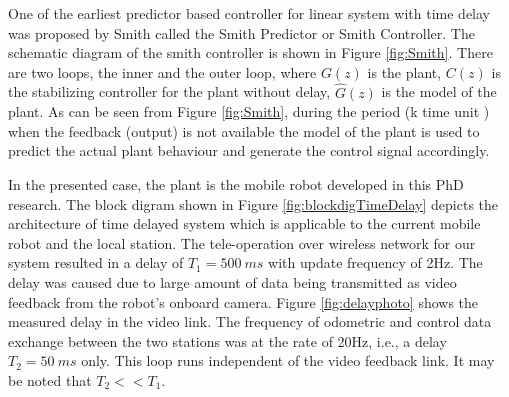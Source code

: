  One of the earliest predictor based controller for linear system with time delay  was proposed by Smith \cite{smith1959controller} called the Smith Predictor or Smith Controller. The schematic diagram of the smith controller is shown in Figure \ref{fig:Smith}. There are two loops, the inner and the outer loop, where $G(z)$ is the plant, $C(z)$ is the stabilizing controller  for the plant without delay, $\hat{G}(z)$ is the model of the plant.  As can be seen from  Figure \ref{fig:Smith}, during the period (k time unit ) when the feedback (output) is not available the model of the plant is used to predict the actual plant behaviour and generate the control signal accordingly. 
 
 In the presented case, the plant is the mobile robot developed in this PhD research. The block digram shown in Figure \ref{fig:blockdigTimeDelay} depicts the architecture of time delayed system which is applicable to the current mobile robot and the local station. The tele-operation  over wireless network for our system   resulted in a delay of $T_1= 500~ms$ with update frequency of 2Hz.  The delay was caused due to large amount of data being transmitted as  video feedback from the robot's onboard camera. Figure \ref{fig:delayphoto} shows the measured delay in the video link. The frequency of odometric and control  data exchange between the two stations was at the rate of 20Hz, i.e., a delay $T_2=50~ms$ only. This  loop runs  independent of the video feedback link.  It may be noted that $T_2<<T_1$.
